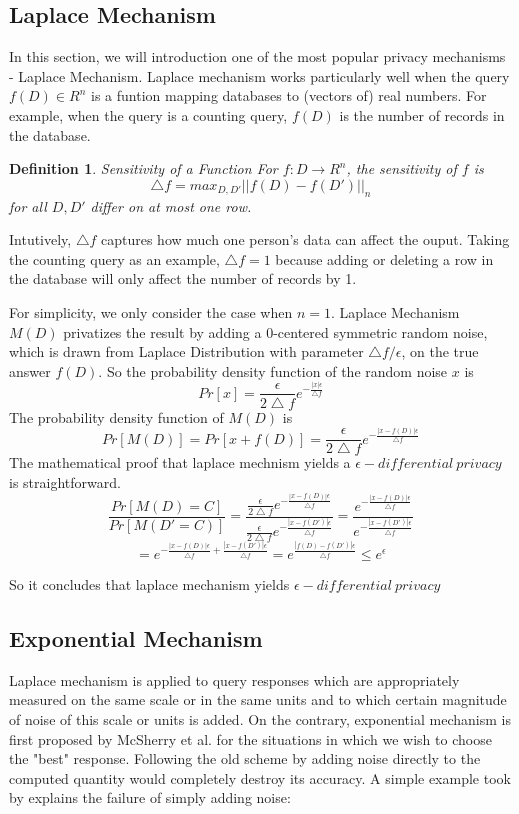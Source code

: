 \documentclass[a4paper, 11pt]{article} %
\makeatletter
\DeclareRobustCommand{\etal}{et al.\@\xspace}
\newtheorem{definition}{Definition}[section]
\makeatother
\begin{document}
\subsection{Laplace Mechanism}
In this section, we will introduction one of the most popular privacy mechanisms - Laplace Mechanism\cite{dwork2006calibrating}. Laplace mechanism works particularly well when the query $f(D)\in R^n$ is a funtion mapping databases to (vectors of) real numbers. For example, when the query is a counting query, $f(D)$ is the number of records in the database.
\begin{definition}{Sensitivity of a Function}
For $f: D\rightarrow R^n$, the sensitivity of $f$ is
	\[  \bigtriangleup f = max_{D, D\prime} ||f(D) - f(D\prime)||_n \]
	for all $D, D\prime$ differ on at most one row.
\end{definition}
Intutively, $\bigtriangleup f$ captures how much one person's data can affect the ouput. Taking the counting query as an example, $\bigtriangleup f = 1$ because adding or deleting a row in the database will only affect the number of records by 1.

For simplicity, we only consider the case when $n=1$. Laplace Mechanism $M(D)$ privatizes the result by adding a 0-centered symmetric random noise, which is drawn from Laplace Distribution\cite{simon1774memoire} with parameter $\bigtriangleup f / \epsilon$,  on the true answer $f(D)$. So the probability density function of the random noise $x$ is
   \[ Pr[x] = \frac{\epsilon}{2\bigtriangleup f}e^{-\frac{|x|\epsilon}{\bigtriangleup f}}  \]
The probability density function of $M(D)$ is
  \[ Pr[M(D)] = Pr[x+f(D)] = \frac{\epsilon}{2\bigtriangleup f}e^{-\frac{|x-f(D)|\epsilon}{\bigtriangleup f}}  \]
  The mathematical proof that laplace mechnism yields a $\epsilon - differential \ privacy$ is straightforward.
  \[ \frac{Pr[M(D) = C]}{Pr[M(D\prime = C)]} = \frac{\frac{\epsilon}{2\bigtriangleup f}e^{-\frac{|x-f(D)|\epsilon}{\bigtriangleup f}} }{\frac{\epsilon}{2\bigtriangleup f}e^{-\frac{|x-f(D\prime)|\epsilon}{\bigtriangleup f}} } = \frac{e^{-\frac{|x-f(D)|\epsilon}{\bigtriangleup f}} }{e^{-\frac{|x-f(D\prime)|\epsilon}{\bigtriangleup f}} } \] \[= e^{-\frac{|x-f(D)|\epsilon}{\bigtriangleup f} + \frac{|x-f(D\prime)|\epsilon}{\bigtriangleup f} } = e^{\frac{|f(D) - f(D\prime)|\epsilon}{\bigtriangleup f}} \leq e^\epsilon \]

So it concludes that laplace mechanism yields $\epsilon - differential \ privacy$

\subsection{Exponential Mechanism}
Laplace mechanism is applied to query responses which are appropriately measured on the same scale or in the same units and to which certain magnitude of noise of this scale or units is added. On the contrary, exponential mechanism is first proposed by McSherry \etal \cite{mcsherry2007mechanism} for the situations  in which we wish to choose the "best" response. Following the old scheme by adding noise directly to the computed quantity would completely destroy its accuracy. A simple example took by \cite{dwork2014algorithmic} explains the failure of simply adding noise:
\end{document}
